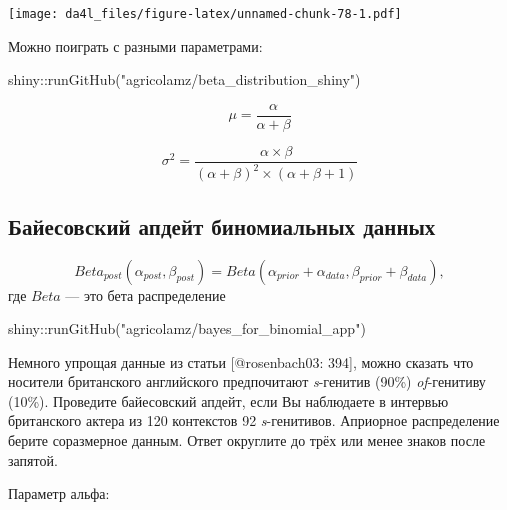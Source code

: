 \documentclass[
]{book}
\makeatletter
\newenvironment{Shaded}{\begin{snugshade}}{\end{snugshade}}
\newcommand{\FunctionTok}[1]{\textcolor[rgb]{0.00,0.00,0.00}{#1}}
\newcommand{\NormalTok}[1]{#1}
\newcommand{\SpecialCharTok}[1]{\textcolor[rgb]{0.00,0.00,0.00}{#1}}
\newcommand{\StringTok}[1]{\textcolor[rgb]{0.31,0.60,0.02}{#1}}
\newenvironment{kframe}{%
    \medskip{}
    \setlength{\fboxsep}{.8em}
    \def\at@end@of@kframe{}%
    \ifinner\ifhmode%
    \def\at@end@of@kframe{\end{minipage}}%
    \begin{minipage}{\columnwidth}%
    \fi\fi%
    \def\FrameCommand##1{\hskip\@totalleftmargin \hskip-\fboxsep
    \colorbox{shadecolor}{##1}\hskip-\fboxsep
        \hskip-\linewidth \hskip-\@totalleftmargin \hskip\columnwidth}%
    \MakeFramed {\advance\hsize-\width
      \@totalleftmargin\z@ \linewidth\hsize
      \@setminipage}}%
  {\par\unskip\endMakeFramed%
    \at@end@of@kframe}
\newenvironment{rmdblock}[1]
  {
    \begin{itemize}
    \renewcommand{\labelitemi}{
      \raisebox{-.7\height}[0pt][0pt]{
        {\setkeys{Gin}{width=3em,keepaspectratio}\texttt{[image: images/\#1]}}
        }
        }
        \setlength{\fboxsep}{1em}
        \begin{kframe}
        \item
      }
      {
        \end{kframe}
        \end{itemize}
      }
\newenvironment{rmdtask}
      {\begin{rmdblock}{task}}
      {\end{rmdblock}}
\makeatother
\begin{document}
\texttt{[image: da4l\_files/figure-latex/unnamed-chunk-78-1.pdf]}

Можно поиграть с разными параметрами:

\begin{Shaded}
\begin{Highlighting}[]
\NormalTok{shiny}\SpecialCharTok{::}\FunctionTok{runGitHub}\NormalTok{(}\StringTok{"agricolamz/beta\_distribution\_shiny"}\NormalTok{) }
\end{Highlighting}
\end{Shaded}

\[\mu = \frac{\alpha}{\alpha+\beta}\]

\[\sigma^2 = \frac{\alpha\times\beta}{(\alpha+\beta)^2\times(\alpha+\beta+1)}\]

\hypertarget{ux431ux430ux439ux435ux441ux43eux432ux441ux43aux438ux439-ux430ux43fux434ux435ux439ux442-ux431ux438ux43dux43eux43cux438ux430ux43bux44cux43dux44bux445-ux434ux430ux43dux43dux44bux445}{%
\subsection{Байесовский апдейт биномиальных данных}\label{ux431ux430ux439ux435ux441ux43eux432ux441ux43aux438ux439-ux430ux43fux434ux435ux439ux442-ux431ux438ux43dux43eux43cux438ux430ux43bux44cux43dux44bux445-ux434ux430ux43dux43dux44bux445}}

\[Beta_{post}(\alpha_{post}, \beta_{post}) = Beta(\alpha_{prior}+\alpha_{data}, \beta_{prior}+\beta_{data}),\]
где \(Beta\) --- это бета распределение

\begin{Shaded}
\begin{Highlighting}[]
\NormalTok{shiny}\SpecialCharTok{::}\FunctionTok{runGitHub}\NormalTok{(}\StringTok{"agricolamz/bayes\_for\_binomial\_app"}\NormalTok{) }
\end{Highlighting}
\end{Shaded}

\begin{rmdtask}
Немного упрощая данные из статьи {[}@rosenbach03: 394{]}, можно сказать
что носители британского английского предпочитают \emph{s}-генитив
(90\%) \emph{of}-генитиву (10\%). Проведите байесовский апдейт, если Вы
наблюдаете в интервью британского актера из 120 контекстов 92
\emph{s}-генитивов. Априорное распределение берите соразмерное данным.
Ответ округлите до трёх или менее знаков после запятой.
\end{rmdtask}

\begin{rmdtask}
Параметр альфа:
\end{rmdtask}
\end{document}
